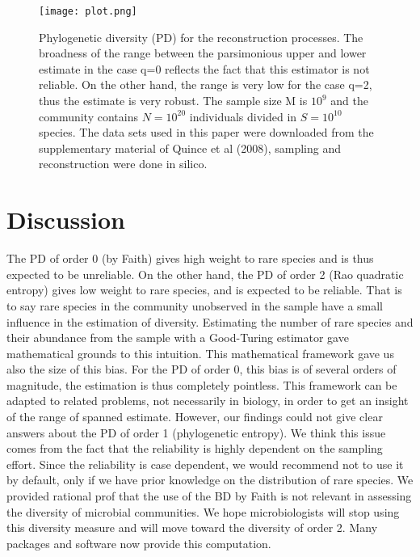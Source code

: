 \documentclass{article}
\begin{document}
	\begin{figure}[H]
	  \centering
       \texttt{[image: plot.png]}
       \caption{Phylogenetic diversity (PD) for the reconstruction processes. The broadness of the range between the parsimonious upper and lower estimate in the case q=0 reflects the fact that this estimator is not reliable. On the other hand, the range is very low for the case q=2, thus the estimate is very robust. The sample size M is $10^{9}$ and the community contains $N=10^{20}$ individuals divided in $S=10^{10}$ species. The data sets used in this paper were downloaded from the supplementary material of Quince et al (2008)\cite{Quince}, sampling and reconstruction were done in silico.}
       
	\end{figure}



\section*{Discussion}

The PD of order 0 (by Faith) gives high weight to rare species and is thus expected to be
unreliable. On the other hand, the PD of order 2 (Rao quadratic entropy) gives low weight to rare
species, and is expected to be reliable. That is to say rare species in the community unobserved in
the sample have a small influence in the estimation of diversity. Estimating the number of rare
species and their abundance from the sample with a Good-Turing estimator gave mathematical grounds to this intuition. This mathematical framework gave us also the size of this bias. For
the PD of order 0, this bias is of several orders of magnitude, the estimation is thus completely
pointless. This framework can be adapted to related problems, not necessarily in biology, in order to
get an insight of the range of spanned estimate. However, our findings could not give clear answers
about the PD of order 1 (phylogenetic entropy). We think this issue comes from the fact that the
reliability is highly dependent on the sampling effort. Since the reliability is case dependent, we
would recommend not to use it by default, only if we have prior knowledge on the distribution of
rare species. We provided rational prof that the use of the BD by Faith is not relevant in assessing the
diversity of microbial communities. We hope microbiologists will stop using this diversity measure
and will move toward the diversity of order 2. Many packages and software now
provide this computation.



\end{document}
